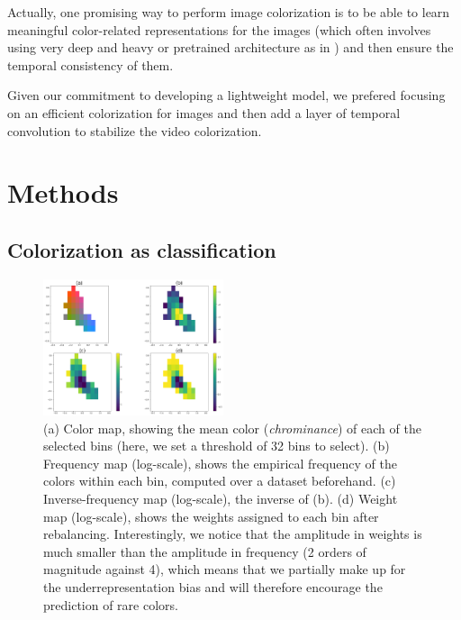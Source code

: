 \documentclass[10pt,twocolumn,letterpaper]{article}
\begin{document}
Actually, one promising way to perform image colorization is to be able to learn meaningful color-related representations for the images (which often involves using very deep and heavy or pretrained architecture as in \cite{larsson2016repres}) and then ensure the temporal consistency of them.

Given our commitment to developing a lightweight model, we prefered focusing on an efficient colorization for images and then add a layer of temporal convolution to stabilize the video colorization.


\section{Methods} \label{methods}

\subsection{Colorization as classification}
\begin{figure}
\begin{center}
\includegraphics[width=200px]{cdexample.png}
\caption{(a) Color map, showing the mean color (\textit{chrominance}) of each of the selected bins (here, we set a threshold of 32 bins to select). (b) Frequency map (log-scale), shows the empirical frequency of the colors within each bin, computed over a dataset beforehand. (c) Inverse-frequency map (log-scale), \ie the inverse of (b). (d) Weight map (log-scale), shows the weights assigned to each bin after rebalancing. Interestingly, we notice that the amplitude in weights is much smaller than the amplitude in frequency (2 orders of magnitude against 4), which means that we partially make up for the underrepresentation bias and will therefore encourage the prediction of rare colors.}
\label{cdex}
\end{center}
\end{figure}
\end{document}
